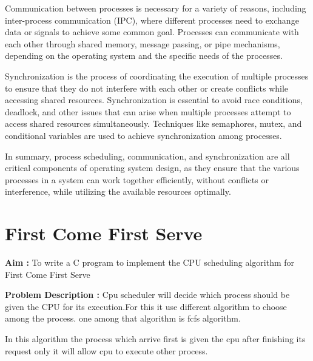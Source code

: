 \documentclass[journal,onecolumn]{IEEEtran}
\begin{document}
Communication between processes is necessary for a variety of reasons, including inter-process communication (IPC), where different processes need to exchange data or signals to achieve some common goal. Processes can communicate with each other through shared memory, message passing, or pipe mechanisms, depending on the operating system and the specific needs of the processes.

Synchronization is the process of coordinating the execution of multiple processes to ensure that they do not interfere with each other or create conflicts while accessing shared resources. Synchronization is essential to avoid race conditions, deadlock, and other issues that can arise when multiple processes attempt to access shared resources simultaneously. Techniques like semaphores, mutex, and conditional variables are used to achieve synchronization among processes.

In summary, process scheduling, communication, and synchronization are all critical components of operating system design, as they ensure that the various processes in a system can work together efficiently, without conflicts or interference, while utilizing the available resources optimally.


\section{First Come First Serve}
\textbf{Aim : } To write a C program to implement the CPU scheduling algorithm for First Come First Serve

\textbf{Problem Description : }
Cpu scheduler will decide which process should be given the CPU for its execution.For this it use different algorithm to choose among the process. one among that algorithm is fcfs algorithm.

In this algorithm the process which arrive first is given the cpu after finishing its request only it will allow cpu to execute other process.
\end{document}
